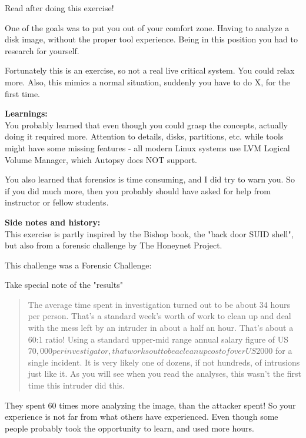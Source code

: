 \documentclass[a4paper,11pt,notitlepage,landscape]{report}
\begin{document}
Read after doing this exercise!

One of the goals was to put you out of your comfort zone. Having to analyze a disk image, without the proper tool experience. Being in this position you had to research for yourself.

Fortunately this is an exercise, so not a real live critical system. You could relax more. Also, this mimics a normal situation, suddenly you have to do X, for the first time.


{\bf Learnings:}\\
You probably learned that even though you could grasp the concepts, actually doing it required more. Attention to details, disks, partitions, etc. while tools might have some missing features - all modern Linux systems use LVM Logical Volume Manager, which Autopsy does NOT support.

You also learned that forensics is time consuming, and I did try to warn you.
So if you did much more, then you probably should have asked for help from instructor or fellow students.

{\bf Side notes and history:}\\
This exercise is partly inspired by the Bishop book, the "back door SUID shell", but also from a forensic challenge by The Honeynet Project.

This challenge was a Forensic Challenge:

Take special note of the "results"

\begin{quote}
The average time spent in investigation turned out to be about 34 hours per person. That's a standard week's worth of work to clean up and deal with the mess left by an intruder in about a half an hour. That's about a 60:1 ratio! Using a standard upper-mid range annual salary figure of US$70,000 per investigator, that works out to be a cleanup cost of over US$2000 for a single incident. It is very likely one of dozens, if not hundreds, of intrusions just like it. As you will see when you read the analyses, this wasn't the first time this intruder did this.
\end{quote}

They spent 60 times more analyzing the image, than the attacker spent! So your experience is not far from what others have experienced. Even though some people probably took the opportunity to learn, and used more hours.
\end{document}

